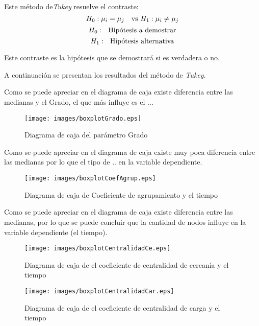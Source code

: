 \documentclass{article}
\begin{document}
Este método de\textit{Tukey} resuelve el contraste:
\begin{equation}
 H_{0}: \mu_{i}= \mu_{j} \ \ \textup{ vs }   H_{1}: \mu_{i} \neq \mu_{j} 
\end{equation}
\begin{equation}
 H_{0}: \ \ \textup{Hipótesis a demostrar}
\end{equation} 
\begin{equation}
 H_{1}: \ \ \textup{Hipótesis  alternativa}
\end{equation} 

Este contraste es la hipótesis que se demostrará si es verdadera o no.

A continuación se presentan los resultados del método de \textit{Tukey}.

Como se puede apreciar en el diagrama de caja existe diferencia entre las medianas y el Grado, el que más influye es el ...

\begin{figure}[H] 
    \centering
              \texttt{[image: images/boxplotGrado.eps]}
\caption{Diagrama de caja del parámetro Grado}
\label{fig:seq1}
\end{figure}   

Como se puede apreciar en el diagrama de caja existe muy poca diferencia entre las medianas por lo que el tipo de .. en la variable dependiente.

\begin{figure}[H]
    \centering
        \texttt{[image: images/boxplotCoefAgrup.eps]}        
\caption{Diagrama de caja de Coeficiente de agrupamiento y el tiempo}
\label{fig:seq1}
\end{figure}

Como se puede apreciar en el diagrama de caja existe diferencia entre las medianas, por lo que se puede concluir que la cantidad de nodos influye en la variable dependiente (el tiempo). 

\begin{figure}[H] 
    \centering
        \texttt{[image: images/boxplotCentralidadCe.eps]}
\caption{Diagrama de caja de el coeficiente de centralidad de cercanía y el tiempo}
\label{fig:seq1}
\end{figure}

\begin{figure}[H] 
    \centering
        \texttt{[image: images/boxplotCentralidadCar.eps]}
\caption{Diagrama de caja de el coeficiente de centralidad de carga y el tiempo}
\label{fig:seq1}
\end{figure}
\end{document}
